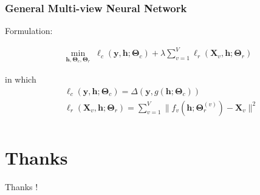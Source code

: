 \documentclass[notheorems, aspectratio=54]{beamer}
\begin{document}
\begin{frame} \frametitle{General Multi-view Neural Network}

Formulation:

\begin{equation}
\begin{split}
  \min_{\mathbf{h}, \boldsymbol{\Theta}_c, \boldsymbol{\Theta}_r}\; \ell_c(\mathbf{y}, \mathbf{h}; \boldsymbol{\Theta}_c) + \lambda \sum_{v=1}^V \ell_r(\mathbf{X}_v, \mathbf{h}; \boldsymbol{\Theta}_r)
\end{split}
\end{equation}

in which 
\begin{equation}
\begin{split}
  & \ell_c(\mathbf{y}, \mathbf{h}; \boldsymbol{\Theta}_c) = \Delta (\mathbf{y}, g(\mathbf{h}; \boldsymbol{\Theta}_c)) \\
  & \ell_r(\mathbf{X}_v, \mathbf{h}; \boldsymbol{\Theta}_r) = \sum_{v=1}^V \|f_v(\mathbf{h}; \boldsymbol{\Theta}_r^{(v)}) - \mathbf{X}_v\|^2 \\
\end{split}
\end{equation}


\end{frame}


\section{Thanks}

\begin{frame}
    
    \centering
    \Huge Thanks !
    
\end{frame}
\end{document}
